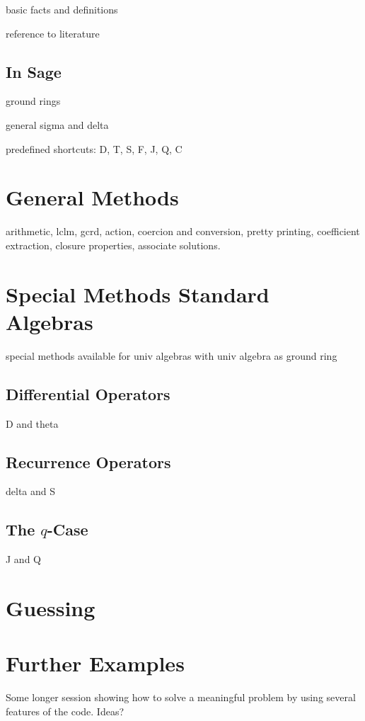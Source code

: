 \documentclass[a4paper,draft]{amsart}
\begin{document}
basic facts and definitions

reference to literature

\subsection{In Sage}

ground rings 

general sigma and delta

predefined shortcuts: D, T, S, F, J, Q, C

\section{General Methods}

arithmetic, lclm, gcrd, action, coercion and conversion, pretty printing, coefficient extraction,
closure properties, associate solutions. 

\section{Special Methods Standard Algebras}

special methods available for univ algebras with univ algebra as ground ring

\subsection{Differential Operators}

D and theta

\subsection{Recurrence Operators}

delta and S

\subsection{The $q$-Case}

J and Q

\section{Guessing}

\section{Further Examples}

Some longer session showing how to solve a meaningful problem by using several features of the code. Ideas?

\subsection{}

\subsection{}

 
 
 
\end{document}
